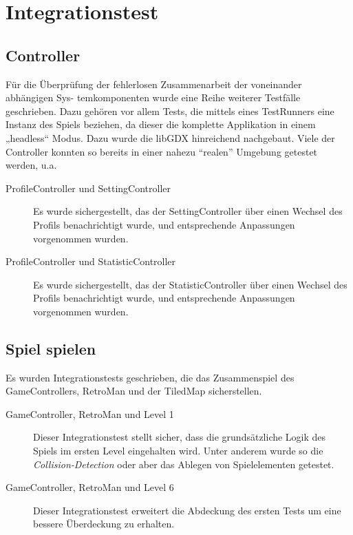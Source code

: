 \documentclass[parskip=full]{scrreprt}
\begin{document}
\section{Integrationstest}

\subsection{Controller}

Für die Überprüfung der fehlerlosen Zusammenarbeit der voneinander abhängigen Sys- temkomponenten wurde eine Reihe weiterer Testfälle geschrieben. Dazu gehören vor allem Tests, die mittels eines TestRunners eine Instanz des Spiels beziehen, da dieser die komplette Applikation in einem „headless“ Modus. Dazu wurde die libGDX hinreichend nachgebaut. Viele der Controller konnten so bereits in einer nahezu \enquote{realen} Umgebung getestet werden, u.a.

\begin{description}
	\item[ProfileController und SettingController] Es wurde sichergestellt, das der SettingController über einen Wechsel des Profils benachrichtigt wurde, und entsprechende Anpassungen vorgenommen wurden.
	\item[ProfileController und StatisticController] Es wurde sichergestellt, das der StatisticController über einen Wechsel des Profils benachrichtigt wurde, und entsprechende Anpassungen vorgenommen wurden.
\end{description}

\subsection{Spiel spielen}

Es wurden Integrationstests geschrieben, die das Zusammenspiel des GameControllers, RetroMan und der TiledMap sicherstellen.

\begin{description}
	\item[GameController, RetroMan und Level 1] Dieser Integrationstest stellt sicher, dass die grundsätzliche Logik des Spiels im ersten Level eingehalten wird. Unter anderem wurde so die \textit{Collision-Detection} oder aber das Ablegen von Spielelementen getestet.
	\item[GameController, RetroMan und Level 6] Dieser Integrationstest erweitert die Abdeckung des ersten Tests um eine bessere Überdeckung zu erhalten.
\end{description}
\end{document}
